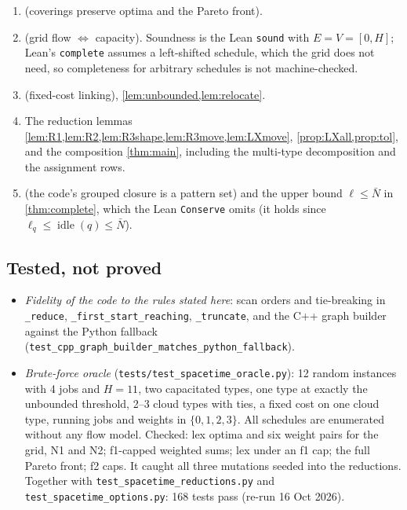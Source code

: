 \documentclass[11pt,a4paper]{article}
\newcommand{\Idle}{\operatorname{idle}}
\newcommand{\code}[1]{\texttt{#1}}
\newcommand{\lean}[1]{\texttt{\small #1}}
\begin{document}
\begin{enumerate}[label=(\roman*)]
\item {} (coverings preserve optima and the Pareto front).
\item {} (grid flow $\Leftrightarrow$ capacity). Soundness is the
  Lean \lean{sound} with $E=V=[0,H]$; Lean's \lean{complete} assumes a
  left-shifted schedule, which the grid does not need, so completeness for
  arbitrary schedules is not machine-checked.
\item {} (fixed-cost linking), \cref{lem:unbounded,lem:relocate}.
\item The reduction lemmas \cref{lem:R1,lem:R2,lem:R3shape,lem:R3move,lem:LXmove},
  \cref{prop:LXall,prop:tol}, and the composition \cref{thm:main}, including
  the multi-type decomposition and the assignment rows.
\item {} (the code's grouped closure is a pattern set) and
  the upper bound $\ell\le\bar N$ in \cref{thm:complete}, which the Lean
  \lean{Conserve} omits (it holds since $\ell_q\le\Idle(q)\le\bar N$).
\end{enumerate}

\subsection{Tested, not proved}

\begin{itemize}
\item \emph{Fidelity of the code to the rules stated here}: scan orders and
  tie-breaking in \code{\_reduce}, \code{\_first\_start\_reaching},
  \code{\_truncate}, and the C++ graph builder against the Python fallback
  (\code{test\_cpp\_graph\_builder\_matches\_python\_fallback}).
\item \emph{Brute-force oracle} (\code{tests/test\_spacetime\_oracle.py}):
  12 random instances with 4 jobs and $H=11$, two capacitated types, one type
  at exactly the unbounded threshold, 2--3 cloud types with ties, a fixed cost
  on one cloud type, running jobs and weights in $\{0,1,2,3\}$. All
  schedules are enumerated without any flow model. Checked: lex optima and six
  weight pairs for the grid, N1 and N2; f1-capped weighted sums; lex under an
  f1 cap; the full Pareto front; f2 caps. It caught all three mutations seeded
  into the reductions. Together with \code{test\_spacetime\_reductions.py} and
  \code{test\_spacetime\_options.py}: 168 tests pass (re-run 16 Oct 2026).
\end{itemize}
\end{document}
